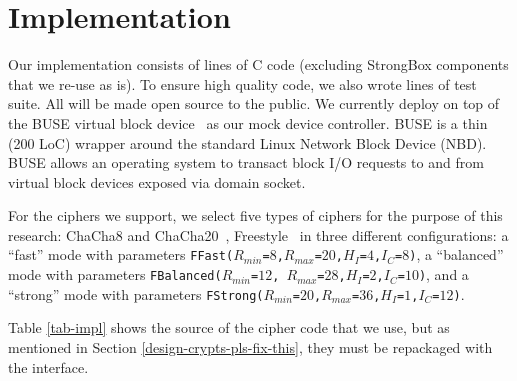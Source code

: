 \section{Implementation}\label{subsec:implementation}

Our \sys implementation consists of \locTotal lines of C code (excluding
StrongBox components that we re-use as is). To ensure high quality code, we also
wrote \locTest lines of test suite. All will be made open source to the public.
We currently deploy \sys on top of the BUSE virtual block device~\cite{BUSE} as
our mock device controller. BUSE is a thin (200 LoC) wrapper around the standard
Linux Network Block Device (NBD). BUSE allows an operating system to transact
block I/O requests to and from virtual block devices exposed via domain socket.



For the ciphers we support, we select five types of ciphers for the purpose of
this research: ChaCha8 and ChaCha20~\cite{ChaCha20}, Freestyle~\cite{Freestyle}
in three different configurations: a ``fast'' mode with parameters
\texttt{FFast($R_{min}$=$8$,$R_{max}$=$20$,$H_I$=$4$,$I_C$=$8$)}, a ``balanced''
mode with parameters \texttt{FBalanced($R_{min}$=$12$,
$R_{max}$=$28$,$H_I$=$2$,$I_C$=$10$)}, and a ``strong'' mode with parameters
\texttt{FStrong($R_{min}$=$20$,$R_{max}$=$36$,$H_I$=$1$,$I_C$=$12$)}. 

Table \ref{tab-impl} shows the source of the cipher code that we use, but as
mentioned in Section \ref{design-crypts-pls-fix-this}, they must be repackaged
with the \sysB interface.

